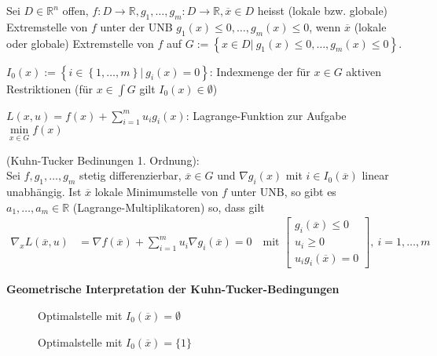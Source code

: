 \begin{defi}
Sei $D\in\mathbb{R}^n$ offen, $f:D\rightarrow\mathbb{R},g_1,\ldots,g_m:D\rightarrow\mathbb{R},\overline{x}\in D$ heisst (lokale bzw. globale) Extremstelle von $f$ unter der \ac{UNB}
$g_1(x)\le 0,\ldots,g_m(x)\le 0$, wenn $\overline{x}$ (lokale oder globale) Extremstelle von $f$ auf $G:=\left\{x\in D|\ g_1(x)\le 0,\ldots,g_m(x)\le 0\right\}$.
\end{defi}
\begin{defi}
$I_0(x):=\left\{ i\in\left\{ 1,\ldots,m \right\}|\ g_i(x)=0 \right\}$: Indexmenge der für $x\in G$ aktiven Restriktionen (für $x\in\int G$ gilt $I_0(x)\in\emptyset$)
\end{defi}
$L(x,u)=f(x)+\sum\limits_{i=1}^{m}u_ig_i(x)$: Lagrange-Funktion zur Aufgabe $\min\limits_{x\in G}f(x)$
\begin{satz}\label{satz:4}
	(Kuhn-Tucker Bedinungen 1. Ordnung):\\
	Sei $f,g_1,\ldots,g_m$ stetig differenzierbar, $\overline{x}\in G$ und $\nabla g_i(x)$ mit $i\in I_0(\overline{x})$ linear unabhängig. Ist $\overline{x}$ lokale Minimumstelle von $f$
	unter \ac{UNB}, so gibt es $a_1,\ldots,a_m\in\mathbb{R}$ (Lagrange-Multiplikatoren) so, dass gilt
	\begin{align*}
	\nabla_x L(\overline{x},u) & = \nabla f(\overline{x})+\sum\limits_{i=1}^m u_i\nabla g_i(\overline{x})= 0\quad\text{mit } \begin{bmatrix}
	g_i(\overline{x})\le 0\\ u_i\ge 0\\ u_ig_i(\overline{x})=0
	\end{bmatrix},\ i=1,\ldots,m
	\end{align*}
\end{satz}
\textbf{Geometrische Interpretation der Kuhn-Tucker-Bedingungen}\\

\begin{figure}[!htb]
	\centering
	
	\caption{Optimalstelle mit $I_0(\overline{x})=\emptyset$}
	\label{fig:kap_1_ktb_opt_0}
\end{figure}

\begin{figure}[!htb]
	\centering
	
	\caption{Optimalstelle mit $I_0(\overline{x})=\{1\}$}
	\label{fig:kap_1_ktb_opt_1}
\end{figure}


